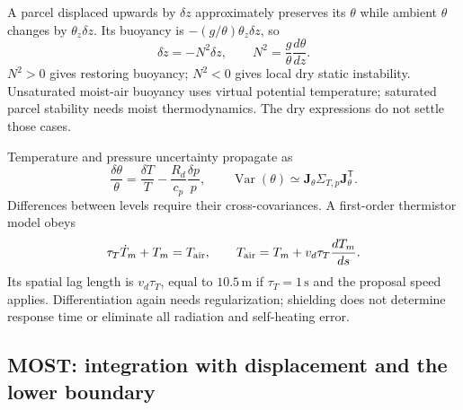 A parcel displaced upwards by $\delta z$ approximately preserves its
$\theta$ while ambient $\theta$ changes by $\theta_z\delta z$.
Its buoyancy is $-(g/\theta)\theta_z\delta z$, so
\begin{equation}
 \delta\ddot z=-N^2\delta z,\qquad
 N^2=\frac{g}{\theta}\frac{d\theta}{dz}.
\end{equation}
$N^2>0$ gives restoring buoyancy; $N^2<0$ gives local dry static
instability. Unsaturated moist-air buoyancy uses virtual potential
temperature; saturated parcel stability needs moist thermodynamics.
The dry expressions do not settle those cases.

Temperature and pressure uncertainty propagate as
\begin{equation}
 \frac{\delta\theta}{\theta}
 =\frac{\delta T}{T}-\frac{R_d}{c_p}\frac{\delta p}{p},
 \qquad \operatorname{Var}(\theta)\simeq
 \boldsymbol J_\theta\Sigma_{T,p}\boldsymbol J_\theta^{\mathsf T}.
\end{equation}
Differences between levels require their cross-covariances. A first-order
thermistor model obeys
\begin{equation}
 \tau_T\dot T_m+T_m=T_{\rm air},\qquad
 T_{\rm air}=T_m+v_d\tau_T\frac{dT_m}{ds}.
\end{equation}
Its spatial lag length is $v_d\tau_T$, equal to $10.5\,\mathrm m$ if
$\tau_T=1\,\mathrm s$ and the proposal speed applies. Differentiation
again needs regularization; shielding does not determine response time or
eliminate all radiation and self-heating error.

\subsection{MOST: integration with displacement and the lower boundary}

